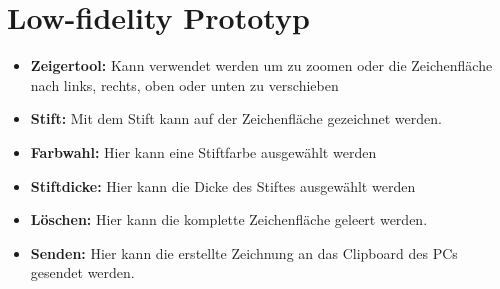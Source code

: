 \documentclass{chi-ext}
\begin{document}
\section{Low-fidelity Prototyp}
\begin{itemize}
	\item {\textbf{Zeigertool:} Kann verwendet werden um zu zoomen oder die Zeichenfläche nach links, rechts, oben oder unten zu verschieben}
	\item {\textbf{Stift:} Mit dem Stift kann auf der Zeichenfläche gezeichnet werden.}
	\item {\textbf{Farbwahl:} Hier kann eine Stiftfarbe ausgewählt werden}
	\item {\textbf{Stiftdicke:} Hier kann die Dicke des Stiftes ausgewählt werden}
	\item {\textbf{Löschen:} Hier kann die komplette Zeichenfläche geleert werden.}
	\item {\textbf{Senden:} Hier kann die erstellte Zeichnung an das Clipboard des PCs gesendet werden.}
\end{itemize}
\end{document}

